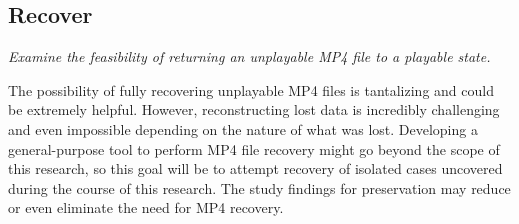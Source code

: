 \subsection{Recover}

\emph{Examine the feasibility of returning an unplayable MP4 file to a playable state.}

The possibility of fully recovering unplayable MP4 files is tantalizing and could be extremely helpful. However, reconstructing lost data is incredibly challenging and even impossible depending on the nature of what was lost. Developing a general-purpose tool to perform MP4 file recovery might go beyond the scope of this research, so this goal will be to attempt recovery of isolated cases uncovered during the course of this research. The study findings for preservation may reduce or even eliminate the need for MP4 recovery.





